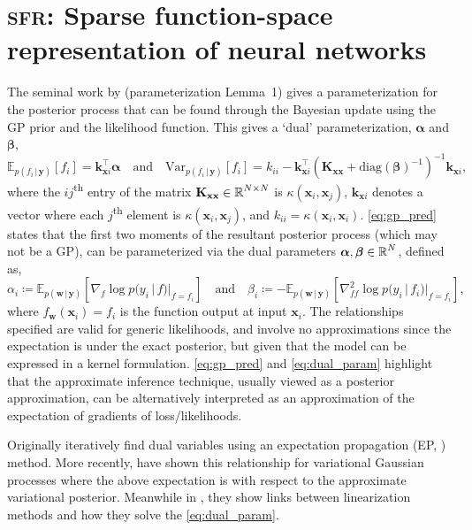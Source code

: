 \documentclass{article}
\renewcommand{\paragraph}[1]{{\bf #1}~~}
\newcommand{\our}{\textsc{sfr}\xspace}
\newcommand{\mathbold}[1]{\bm{#1}}
\newcommand{\mbf}[1]{\mathbf{#1}}
\renewcommand{\mid}{\,|\,}
\newcommand{\valpha}[0]{\mathbold{\alpha}}
\newcommand{\vbeta}[0]{\mathbold{\beta}}
\newcommand{\diag}{\text{{diag}}}
\newcommand{\vx}{\mbf{x}}
\newcommand{\vy}{\mbf{y}}
\newcommand{\vw}{\mbf{w}}
\newcommand{\MKxx}{\mbf{K}_{\mbf{x}\mbf{x}}}
\newcommand{\vk}{\mbf{k}}
\newcommand{\myexpect}{\mathbb{E}}
\begin{document}
\section{\our: Sparse function-space representation of neural networks}\label{sec:sfr}
The seminal work by \citet{csato2002sparse} (parameterization Lemma~1) gives a parameterization for the posterior process that can be found through the Bayesian update using the GP prior and the likelihood function. This gives a `dual' parameterization, $\valpha$ and $\vbeta$,
%
\begin{equation}  \label{eq:gp_pred}
  \myexpect_{p(f_i \mid\vy)}[f_i]= \vk_{\vx i}^\top \valpha \quad \text{and} \quad
  \mathrm{Var}_{p(f_i \mid \vy)}[f_i] = k_{ii} - \vk_{\vx i}^\top ( \MKxx + \diag(\vbeta)^{-1})^{-1} \vk_{\vx i},
\end{equation}
%
where the $ij$\textsuperscript{th} entry of the matrix $\MKxx \in \R^{N \times N}$ is $\kappa(\vx_i,\vx_j)$, $\vk_{\vx i}$ denotes a vector where each $j$\textsuperscript{th} element is $\kappa(\vx_i, \vx_j)$, and $k_{ii} = \kappa(\vx_i, \vx_i)$.
\cref{eq:gp_pred} states that the first two moments of the resultant posterior process (which may not be a GP), can be parameterized via the dual
parameters $\valpha, \vbeta \in \R^{N}$,
defined as, 
%
\begin{equation}
  \label{eq:dual_param}
  \alpha_i \coloneqq \myexpect_{p(\vw \mid \vy)}[\nabla_{f}\log p(y_i \mid f) |_{f=f_i}]
  \quad \text{and} \quad
  \beta_i \coloneqq - \myexpect_{p(\vw \mid \vy)}[\nabla^2_{f f}\log p(y_i \mid f_i) |_{f=f_i}],
\end{equation}
%
where $f_\vw(\vx_i) = f_i$ is the function output at input $\vx_i$. The relationships specified are valid for generic likelihoods, and involve no approximations since the expectation is under the exact posterior, but given that the model can be expressed in a kernel formulation. \cref{eq:gp_pred} and \cref{eq:dual_param} highlight that the approximate inference technique, usually viewed as a posterior approximation, can be alternatively interpreted as an approximation of the expectation of gradients of loss/likelihoods.

Originally \citet{csato2002sparse} iteratively find dual variables using an expectation propagation (EP, \cite{minka2001expectation}) method. More recently, \cite{khan2017conjugate,adam2021dual} have shown this relationship for variational Gaussian processes where the above expectation is with respect to the approximate variational posterior. Meanwhile in \citet{wilkinson2023bayes}, they show links between linearization methods and how they solve the \cref{eq:dual_param}.
\end{document}
